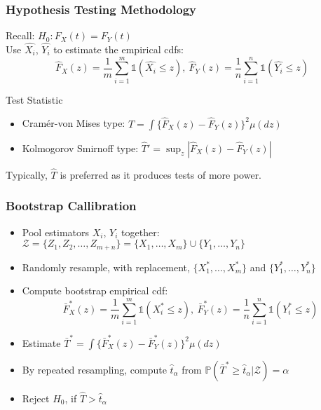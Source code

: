 \documentclass[10pt,dvipsnames,table]{beamer}
\newcommand{\Prob}{\mathds{P}}
\newcommand{\Ind}{\mathds{1}}
\begin{document}
\begin{frame}
\frametitle{Hypothesis Testing Methodology}
Recall: $H_0: F_X(t) = F_Y(t)$ \\
 Use $\hat{X_i}$, $\hat{Y_i}$ to estimate the empirical cdfs: 
\[ \hat{F}_X(z) = \frac{1}{m}\sum_{i=1}^{m} \Ind(\hat{X_i} \leq z), \ \hat{F}_Y(z) = \frac{1}{n}\sum_{i=1}^{n} \Ind(\hat{Y_i} \leq z)\]

\begin{block}{Test Statistic}
\begin{itemize}
\item Cram\'{e}r-von Mises type: $\hat{T} = \int \{\hat{F}_X(z) - \hat{F}_Y(z) \}^2 \mu(dz)$ 
\item Kolmogorov Smirnoff type: $\hat{T}' = \sup_z|\hat{F}_X(z) - \hat{F}_Y(z)|$
\end{itemize}
Typically, $\hat{T}$ is preferred as it produces tests of more power.
\end{block}
\end{frame}

\begin{frame}
\frametitle{Bootstrap Callibration}
\begin{itemize}
\item Pool estimators $X_i$, $Y_i$ together: $\mathcal{Z} = \{Z_1, Z_2, \dots, Z_{m+n} \} = \{X_1,\dots, X_m \} \cup \{Y_1,\dots, Y_n \}$
\item Randomly resample, with replacement, $\{X_1^*,\dots, X_m^* \}$ and $\{Y_1^*,\dots, Y_n^* \}$
\item Compute bootstrap empirical cdf: \[\bar{F}^*_X(z) = \frac{1}{m}\sum_{i=1}^{m} \Ind(X^*_i \leq z), \ \bar{F}^*_Y(z) = \frac{1}{n}\sum_{i=1}^{n} \Ind(Y_i^* \leq z)\]
\item Estimate $\bar{T}^* = \int \{\bar{F}^*_X(z) - \bar{F}^*_Y(z) \}^2 \mu(dz)$
\item By repeated resampling, compute $\hat{t}_{\alpha}$ from $\Prob(\bar{T}^* \geq \hat{t}_{\alpha} | \mathcal{Z}) = \alpha$
\item Reject $H_0$, if $\hat{T} > \hat{t}_{\alpha}$
\end{itemize}
\end{frame}
\end{document}
